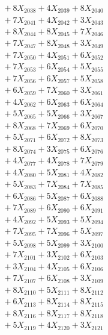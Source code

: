 \documentclass[a4paper,10pt]{article}
\begin{document}
{\begin{align}
&\;  + 8 X_{2038} + 4 X_{2039} + 8 X_{2040} \\[0.3ex]
&\;  + 7 X_{2041} + 4 X_{2042} + 3 X_{2043} \\[0.3ex]
&\;  + 8 X_{2044} + 8 X_{2045} + 7 X_{2046} \\[0.3ex]
&\;  + 7 X_{2047} + 8 X_{2048} + 3 X_{2049} \\[0.5ex]\allowbreak
&\;  + 7 X_{2050} + 4 X_{2051} + 6 X_{2052} \\[0.3ex]
&\;  + 7 X_{2053} + 6 X_{2054} + 5 X_{2055} \\[0.3ex]
&\;  + 7 X_{2056} + 6 X_{2057} + 5 X_{2058} \\[0.3ex]
&\;  + 6 X_{2059} + 7 X_{2060} + 3 X_{2061} \\[0.3ex]
&\;  + 4 X_{2062} + 6 X_{2063} + 6 X_{2064} \\[0.3ex]
&\;  + 5 X_{2065} + 5 X_{2066} + 3 X_{2067} \\[0.3ex]
&\;  + 8 X_{2068} + 7 X_{2069} + 6 X_{2070} \\[0.3ex]
&\;  + 5 X_{2071} + 6 X_{2072} + 8 X_{2073} \\[0.3ex]
&\;  + 8 X_{2074} + 3 X_{2075} + 6 X_{2076} \\[0.3ex]
&\;  + 4 X_{2077} + 4 X_{2078} + 7 X_{2079} \\[0.5ex]\allowbreak
&\;  + 4 X_{2080} + 5 X_{2081} + 4 X_{2082} \\[0.3ex]
&\;  + 5 X_{2083} + 7 X_{2084} + 7 X_{2085} \\[0.3ex]
&\;  + 6 X_{2086} + 5 X_{2087} + 6 X_{2088} \\[0.3ex]
&\;  + 7 X_{2089} + 6 X_{2090} + 6 X_{2091} \\[0.3ex]
&\;  + 4 X_{2092} + 5 X_{2093} + 5 X_{2094} \\[0.3ex]
&\;  + 7 X_{2095} + 7 X_{2096} + 5 X_{2097} \\[0.3ex]
&\;  + 5 X_{2098} + 5 X_{2099} + 3 X_{2100} \\[0.3ex]
&\;  + 7 X_{2101} + 3 X_{2102} + 6 X_{2103} \\[0.3ex]
&\;  + 3 X_{2104} + 4 X_{2105} + 6 X_{2106} \\[0.3ex]
&\;  + 7 X_{2107} + 6 X_{2108} + 3 X_{2109} \\[0.5ex]\allowbreak
&\;  + 8 X_{2110} + 5 X_{2111} + 8 X_{2112} \\[0.3ex]
&\;  + 6 X_{2113} + 8 X_{2114} + 8 X_{2115} \\[0.3ex]
&\;  + 8 X_{2116} + 8 X_{2117} + 8 X_{2118} \\[0.3ex]
&\;  + 5 X_{2119} + 4 X_{2120} + 3 X_{2121} \\[0.3ex]

\end{align}}
\end{document}
